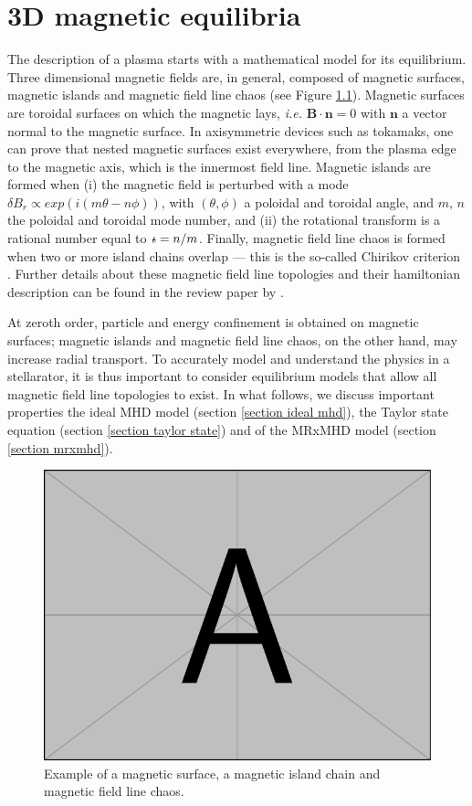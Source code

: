 \documentclass[my_thesis.tex]{subfiles}
\begin{document}
\chapter{3D magnetic equilibria}

The description of a plasma starts with a mathematical model for its equilibrium. Three dimensional magnetic fields are, in general, composed of  magnetic surfaces, magnetic islands and magnetic field line chaos (see Figure \ref{fig. topology examples}). Magnetic surfaces are toroidal surfaces on which the magnetic lays, \textit{i.e.} $\mathbf{B}\cdot\mathbf{n}=0$ with $\mathbf{n}$ a vector normal to the magnetic surface. In axisymmetric devices such as tokamaks, one can prove that nested magnetic surfaces exist everywhere, from the plasma edge to the magnetic axis, which is the innermost field line. Magnetic islands are formed when (i) the magnetic field is perturbed with a mode $\delta B_r \propto exp(i(m\theta-n\phi))$, with $(\theta,\phi)$ a poloidal and toroidal angle, and $m$, $n$ the poloidal and toroidal mode number, and (ii) the rotational transform is a rational number equal to $\text{$\iota\!\!$-}=n/m$. Finally, magnetic field line chaos is formed when two or more island chains overlap --- this is the so-called Chirikov criterion \citep{chirikov}. Further details about these magnetic field line topologies and their hamiltonian description can be found in the review paper by \citet{Meiss1992c}.

At zeroth order, particle and energy confinement is obtained on magnetic surfaces; magnetic islands and magnetic field line chaos, on the other hand, may increase radial transport. To accurately model and understand the physics in a stellarator, it is thus important to consider equilibrium models that allow all magnetic field line topologies to exist. In what follows, we discuss important properties the ideal \ac{MHD} model (section \ref{section ideal mhd}), the Taylor state equation (section \ref{section taylor state}) and of the \ac{MRxMHD} model (section \ref{section mrxmhd}).

\begin{figure}
\centering
\includegraphics[width=\linewidth]{images/example-image-a.pdf}
\caption{Example of a magnetic surface, a magnetic island chain and magnetic field line chaos.}
\label{fig. topology examples}
\end{figure}
\end{document}
